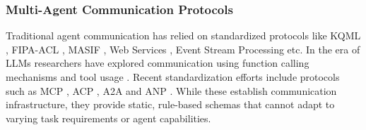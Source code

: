 \subsubsection{Multi-Agent Communication Protocols}
Traditional agent communication has relied on standardized protocols like KQML \cite{finin1994kqml}, FIPA-ACL \cite{fipa1997acl}, MASIF \cite{milojicic1999masif}, Web Services \cite{berners2001web}, Event Stream Processing \cite{cugola2012processing} etc.
In the era of LLMs researchers have explored communication using function calling mechanisms \cite{schick2023toolformer} and tool usage \cite{schick2023toolformer}.
Recent standardization efforts include protocols such as MCP \cite{anthropic2024mcp}, ACP \cite{acp2024protocol}, A2A \cite{a2a2024protocol} and ANP \cite{anp2024protocol}. While these establish communication infrastructure, they provide static, rule-based schemas that cannot adapt to varying task requirements or agent capabilities.

